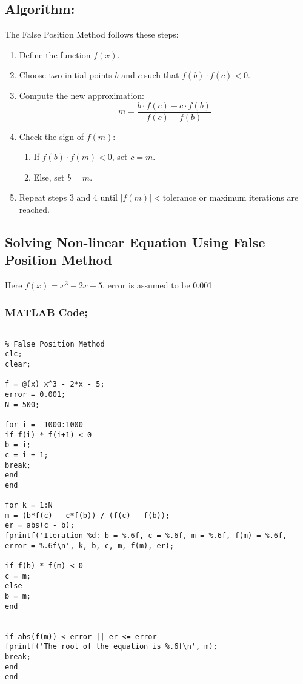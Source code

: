 \documentclass[a4paper,12pt]{article}
\begin{document}
	\subsection{Algorithm:}
	The False Position Method follows these steps:
	\begin{enumerate}
		\item Define the function $f(x)$.
		\item Choose two initial points $b$ and $c$ such that $f(b) \cdot f(c) < 0$.
		\item Compute the new approximation:
		\[
		m = \frac{b \cdot f(c) - c \cdot f(b)}{f(c) - f(b)}
		\]
		\item Check the sign of $f(m)$:
		\begin{enumerate}
			\item If $f(b) \cdot f(m) < 0$, set $c = m$.
			\item Else, set $b = m$.
		\end{enumerate}
		\item Repeat steps 3 and 4 until $|f(m)| < \text{tolerance}$ or maximum iterations are reached.
	\end{enumerate}
	
	


	
	
	
	\subsection{Solving Non-linear Equation Using False Position Method }
	Here $f(x) = x^3 - 2x - 5$, 
	error is assumed to be 0.001 
	
	
	
	\subsubsection{MATLAB Code;}
	\begin{lstlisting}[style=vscode-light, caption={Solving Non-linear Equation Using  False Position Method in MATLAB.} ]
		
% False Position Method
clc;
clear;

f = @(x) x^3 - 2*x - 5; 
error = 0.001;   
N = 500;         

for i = -1000:1000
if f(i) * f(i+1) < 0
b = i;
c = i + 1;
break;
end
end

for k = 1:N
m = (b*f(c) - c*f(b)) / (f(c) - f(b)); 
er = abs(c - b);  
fprintf('Iteration %d: b = %.6f, c = %.6f, m = %.6f, f(m) = %.6f, error = %.6f\n', k, b, c, m, f(m), er);

if f(b) * f(m) < 0
c = m;  
else
b = m;  
end


if abs(f(m)) < error || er <= error
fprintf('The root of the equation is %.6f\n', m);
break;
end
end

		
	\end{lstlisting}
	
\end{document}
